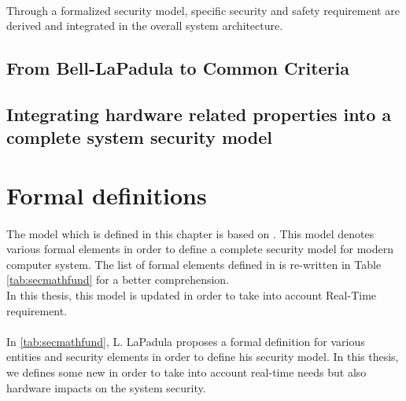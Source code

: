 \paragraph{}
Through a formalized security model, specific security and safety requirement are derived and
integrated in the overall system architecture.

\subsection{From Bell-LaPadula to Common Criteria}

\paragraph{}

\subsection{Integrating hardware related properties into a complete system security model}

\paragraph{}

\section{Formal definitions}

\paragraph{}
The model which is defined in this chapter is based on \cite{secmathfund}. This model denotes
various formal elements in order to define a complete security model for modern computer system.
The list of formal elements defined in \cite{secmathfund} is re-written in Table
\ref{tab:secmathfund} for a better comprehension.\\
In this thesis, this model is updated in order to take into account Real-Time requirement.

\paragraph{}
In \ref{tab:secmathfund}, L. LaPadula proposes a formal definition for various entities and
security elements in order to define his security model. In this thesis, we defines some new
in order to take into account real-time needs but also hardware impacts on the system security.

